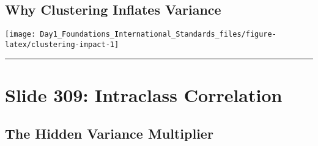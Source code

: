 \documentclass[
]{article}
\begin{document}
\subsection{Why Clustering Inflates
Variance}\label{why-clustering-inflates-variance}

\texttt{[image: Day1\_Foundations\_International\_Standards\_files/figure-latex/clustering-impact-1]}

\begin{center}\rule{0.5\linewidth}{0.5pt}\end{center}

\section{Slide 309: Intraclass
Correlation}\label{slide-309-intraclass-correlation}

\subsection{The Hidden Variance
Multiplier}\label{the-hidden-variance-multiplier}
\end{document}
